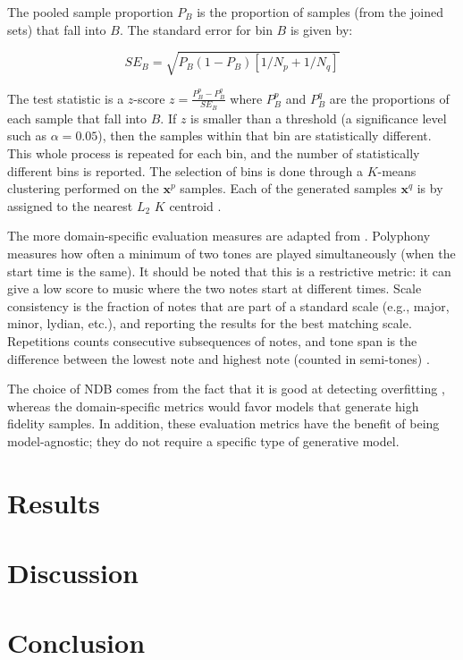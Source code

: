 \documentclass[a4paper]{book}
\begin{document}
The pooled sample proportion $P_B$ is the proportion of samples (from the joined sets) that fall into $B$. The standard error for bin $B$ is given by:

\begin{equation}
    SE_B = \sqrt{P_B (1 - P_B)[1 / N_p + 1 / N_q]}
\end{equation}

The test statistic is a $z$-score $z = \frac{P_B^p - P_B^q}{SE_B}$ where $P_B^p$ and $P_B^q$ are the proportions of each sample that fall into $B$. If $z$ is smaller than a threshold (a significance level such as $\alpha = 0.05$), then the samples within that bin are statistically different. This whole process is repeated for each bin, and the number of statistically different bins is reported. The selection of bins is done through a $K$-means clustering performed on the $\mathbf{x}^p$ samples. Each of the generated samples $\mathbf{x}^q$ is by assigned to the nearest $L_2$ $K$ centroid \parencite{richardson_gans_2018}.

The more domain-specific evaluation measures are adapted from \textcite{mogren_c-rnn-gan_2016}. Polyphony measures how often a minimum of two tones are played simultaneously (when the start time is the same). It should be noted that this is a restrictive metric: it can give a low score to music where the two notes start at different times. Scale consistency is the fraction of notes that are part of a standard scale (e.g., major, minor, lydian, etc.), and reporting the results for the best matching scale. Repetitions counts consecutive subsequences of notes, and tone span is the difference between the lowest note and highest note (counted in semi-tones) \parencite{mogren_c-rnn-gan_2016}.

The choice of NDB comes from the fact that it is good at detecting overfitting \parencite{borji_pros_2018}, whereas the domain-specific metrics would favor models that generate high fidelity samples. In addition, these evaluation metrics have the benefit of being model-agnostic; they do not require a specific type of generative model.

\chapter{Results}

\chapter{Discussion}

\chapter{Conclusion}

\printbibliography
\end{document}
